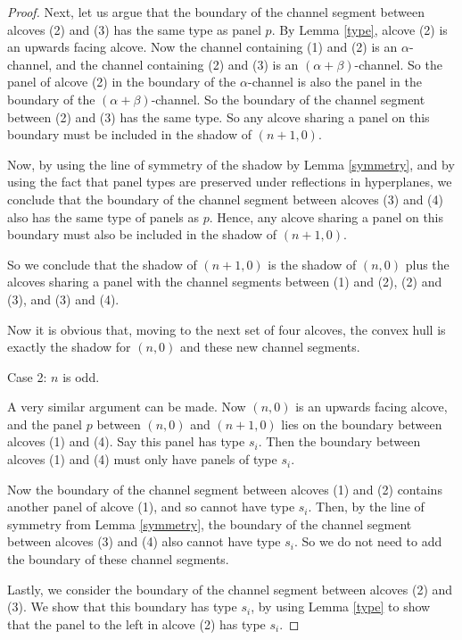 \documentclass[11pt]{article}
\begin{document}
\begin{proof}
    Next, let us argue that the boundary of the channel segment between alcoves (2) and (3) has the same type as panel $p$. By Lemma \ref{type}, alcove (2) is an upwards facing alcove. Now the channel containing (1) and (2) is an $\alpha$-channel, and the channel containing (2) and (3) is an $(\alpha+\beta)$-channel. So the panel of alcove (2) in the boundary of the $\alpha$-channel is also the panel in the boundary of the $(\alpha+\beta)$-channel. So the boundary of the channel segment between (2) and (3) has the same type. So any alcove sharing a panel on this boundary must be included in the shadow of $(n+1,0)$. 
    
    Now, by using the line of symmetry of the shadow by Lemma \ref{symmetry}, and by using the fact that panel types are preserved under reflections in hyperplanes, we conclude that the boundary of the channel segment between alcoves (3) and (4) also has the same type of panels as $p$. Hence, any alcove sharing a panel on this boundary must also be included in the shadow of $(n+1,0)$. 

    So we conclude that the shadow of $(n+1,0)$ is the shadow of $(n,0)$ plus the alcoves sharing a panel with the channel segments between (1) and (2), (2) and (3), and (3) and (4).
\begin{center}
\resizebox{0.3\textwidth}{!}{}
\end{center}
    

Now it is obvious that, moving to the next set of four alcoves, the convex hull is exactly the shadow for $(n,0)$ and these new channel segments. 



Case 2: $n$ is odd. 


A very similar argument can be made. Now $(n,0)$ is an upwards facing alcove, and the panel $p$ between $(n,0)$ and $(n+1,0)$ lies on the boundary between alcoves (1) and (4). Say this panel has type $s_i$. Then the boundary between alcoves (1) and (4) must only have panels of type $s_i$. 

Now the boundary of the channel segment between alcoves (1) and (2) contains another panel of alcove (1), and so cannot have type $s_i$. Then, by the line of symmetry from Lemma \ref{symmetry}, the boundary of the channel segment between alcoves (3) and (4) also cannot have type $s_i$. So we do not need to add the boundary of these channel segments.

Lastly, we consider the boundary of the channel segment between alcoves (2) and (3). We show that this boundary has type $s_i$, by using Lemma \ref{type} to show that the panel to the left in alcove (2) has type $s_i$.


\end{proof}
\end{document}
